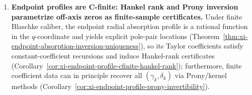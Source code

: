 \begin{enumerate}
  \item \textbf{Endpoint profiles are C-finite: Hankel rank and Prony inversion parametrize off-axis zeros as finite-sample certificates.}
  Under finite Blaschke caliber, the endpoint radial absorption profile is a rational function in the \(q\)-coordinate and yields explicit pole-pair locations (Theorem~\ref{thm:xi-endpoint-absorption-inversion-uniqueness}), so its Taylor coefficients satisfy constant-coefficient recursions and induce Hankel-rank certificates (Corollary~\ref{cor:xi-endpoint-profile-cfinite-hankel-rank}); furthermore, finite coefficient data can in principle recover all \((\gamma_k,\delta_k)\) via Prony/kernel methods (Corollary~\ref{cor:xi-endpoint-profile-prony-invertibility}).
\end{enumerate}

